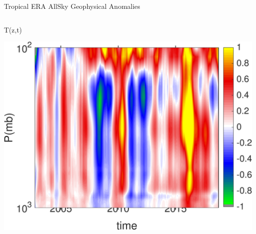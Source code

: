 \documentclass[10pt,t]{beamer}
\begin{document}
\begin{frame}{Tropical ERA AllSky Geophysical Anomalies}
\vspace{-0.35in}

\begin{columns}
\begin{column}{0.45\columnwidth}
\begin{block}{\footnotesize T(z,t)}
\vspace{-0.1in}
\begin{center}
\includegraphics[width=\linewidth]{Figs/CloudAnom/Desc_ocean_orig/era_cld_ptemp_anom_200209_201808.png}
\end{center}
\end{block}
\end{column}


\end{columns}
\end{frame}
\end{document}
